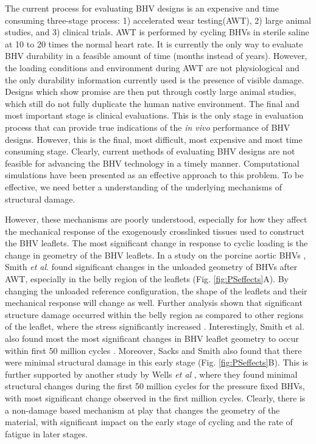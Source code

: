 	The current process for evaluating BHV designs is an expensive and time consuming three-stage process: 1) accelerated wear testing(AWT), 2) large animal studies, and 3) clinical trials. AWT is performed by cycling BHVs in sterile saline at 10 to 20 times the normal heart rate. It is currently the only way to evaluate BHV durability in a feasible amount of time (months instead of years). However, the loading conditions and environment during AWT are not physiological and the only durability information currently used is the presence of visible damage. Designs which show promise are then put through costly large animal studies, which still do not fully duplicate the human native environment. The final and most important stage is clinical evaluations. This is the only stage in evaluation process that can provide true indications of the \textit{in vivo} performance of BHV designs. However, this is the final, most difficult, most expensive and most time consuming stage. Clearly, current methods of evaluating BHV designs are not feasible for advancing the BHV technology in a timely manner. Computational simulations have been presented as an effective approach to this problem\cite{soares_biomechanical_2016}. To be effective, we need better a understanding of the underlying mechanisms of structural damage. 
	

	However, these mechanisms are poorly understood, especially for how they affect the mechanical response of the exogenously crosslinked tissues used to construct the BHV leaflets. The most significant change in response to cyclic loading is the change in geometry of the BHV leaflets. In a study on the porcine aortic BHVs \cite{smith_high_1997},  Smith \textit{et al}. found significant changes in the unloaded geometry of BHVs after AWT, especially in the belly region of the leaflets (Fig. \ref{fig:PSeffects}A). By changing the unloaded reference configuration, the shape of the leaflets and their mechanical response will change as well. Further analysis shown that significant structure damage occurred within the belly region as compared to other regions of the leaflet, where the stress significantly increased \cite{smith_fatigue_1999}. Interestingly, Smith et al. also found most the most significant changes in BHV leaflet geometry to occur within first 50 million cycles \cite{smith_high_1997}. Moreover, Sacks and Smith \cite{sacks_effects_1998} also found that there were minimal structural damage in this early stage (Fig. \ref{fig:PSeffects}B). This is further supported by another study by Wells \textit{et al} \cite{wells_cyclic_2005}, where they found minimal structural changes during the first 50 million cycles for the pressure fixed BHVs, with most significant change observed in the first million cycles. Clearly, there is a non-damage based mechanism at play that changes the geometry of the material, with significant impact on the early stage of cycling and the rate of fatigue in later stages. 


